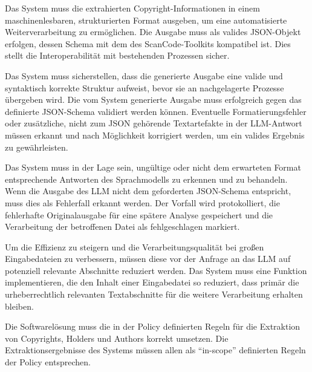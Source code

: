 \begin{anforderungsliste}
        {Das System muss die extrahierten Copyright-Informationen in einem maschinenlesbaren, strukturierten Format ausgeben, um eine automatisierte Weiterverarbeitung zu ermöglichen.}
        {Die Ausgabe muss als valides JSON-Objekt erfolgen, dessen Schema mit dem des ScanCode-Toolkits kompatibel ist. Dies stellt die Interoperabilität mit bestehenden Prozessen sicher.}

        {Das System muss sicherstellen, dass die generierte Ausgabe eine valide und syntaktisch korrekte Struktur aufweist, bevor sie an nachgelagerte Prozesse übergeben wird.}
        {Die vom System generierte Ausgabe muss erfolgreich gegen das definierte JSON-Schema validiert werden können. Eventuelle Formatierungsfehler oder zusätzliche, nicht zum JSON gehörende Textartefakte in der LLM-Antwort müssen erkannt und nach Möglichkeit korrigiert werden, um ein valides Ergebnis zu gewährleisten.}

        {Das System muss in der Lage sein, ungültige oder nicht dem erwarteten Format entsprechende Antworten des Sprachmodells zu erkennen und zu behandeln.}
        {Wenn die Ausgabe des LLM nicht dem geforderten JSON-Schema entspricht, muss dies als Fehlerfall erkannt werden. Der Vorfall wird protokolliert, die fehlerhafte Originalausgabe für eine spätere Analyse gespeichert und die Verarbeitung der betroffenen Datei als fehlgeschlagen markiert.}

        {Um die Effizienz zu steigern und die Verarbeitungsqualität bei großen Eingabedateien zu verbessern, müssen diese vor der Anfrage an das LLM auf potenziell relevante Abschnitte reduziert werden.}
        {Das System muss eine Funktion implementieren, die den Inhalt einer Eingabedatei so reduziert, dass primär die urheberrechtlich relevanten Textabschnitte für die weitere Verarbeitung erhalten bleiben.}

        {Die Softwarelösung muss die in der Policy definierten Regeln für die Extraktion von Copyrights, Holders und Authors korrekt umsetzen.}
        {Die Extraktionsergebnisse des Systems müssen allen als \enquote{in-scope} definierten Regeln der Policy entsprechen.}
\end{anforderungsliste}


